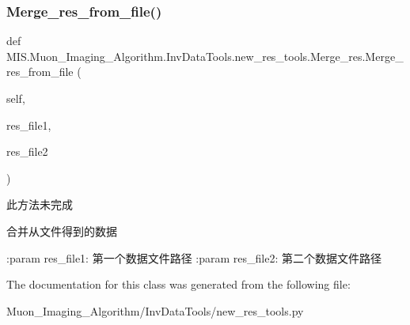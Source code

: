 \subsubsection{\texorpdfstring{Merge\+\_\+res\+\_\+from\+\_\+file()}{Merge\_res\_from\_file()}}
{\footnotesize\ttfamily def M\+I\+S.\+Muon\+\_\+\+Imaging\+\_\+\+Algorithm.\+Inv\+Data\+Tools.\+new\+\_\+res\+\_\+tools.\+Merge\+\_\+res.\+Merge\+\_\+res\+\_\+from\+\_\+file (\begin{DoxyParamCaption}\item[{}]{self,  }\item[{}]{res\+\_\+file1,  }\item[{}]{res\+\_\+file2 }\end{DoxyParamCaption})}

\begin{DoxyVerb}此方法未完成

合并从文件得到的数据

:param res_file1: 第一个数据文件路径
:param res_file2: 第二个数据文件路径
\end{DoxyVerb}
 

The documentation for this class was generated from the following file\+:\begin{DoxyCompactItemize}
\item 
Muon\+\_\+\+Imaging\+\_\+\+Algorithm/\+Inv\+Data\+Tools/new\+\_\+res\+\_\+tools.\+py\end{DoxyCompactItemize}
